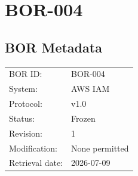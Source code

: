 \documentclass{article}
\begin{document}
\section*{BOR-004}

\subsection*{BOR Metadata}
\begin{tabular}{@{}ll@{}}
\toprule
BOR ID: & BOR-004\\
System: & AWS IAM\\
Protocol: & v1.0\\
Status: & Frozen\\
Revision: & 1\\
Modification: & None permitted\\
Retrieval date: & 2026-07-09\\
\bottomrule
\end{tabular}
\end{document}
